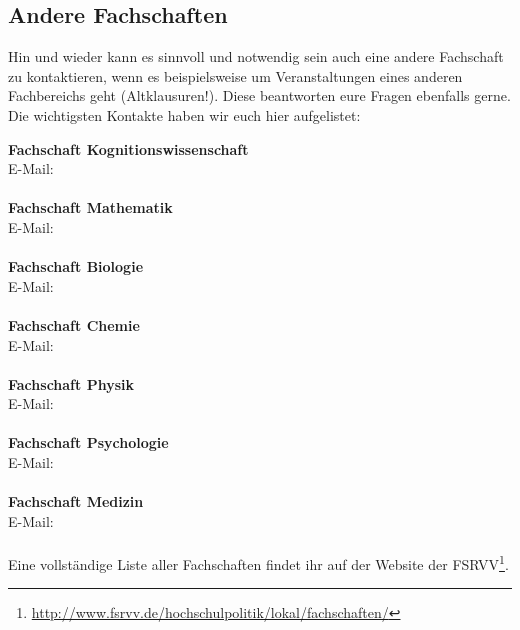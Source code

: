 

\vfill
\subsection{Andere Fachschaften}
Hin und wieder kann es sinnvoll und notwendig sein auch eine andere Fachschaft
zu kontaktieren, wenn es beispielsweise um Veranstaltungen eines anderen
Fachbereichs geht (Altklausuren!). Diese beantworten eure Fragen ebenfalls
gerne. Die wichtigsten Kontakte haben wir euch hier aufgelistet:

\textbf{Fachschaft Kognitionswissenschaft}\\
E-Mail: \\
\\
\textbf{Fachschaft Mathematik}\\
E-Mail: \\
\\
\textbf{Fachschaft Biologie}\\
E-Mail: \\
\\
\textbf{Fachschaft Chemie}\\
E-Mail: \\
\\
\textbf{Fachschaft Physik}\\
E-Mail: \\
\\
\textbf{Fachschaft Psychologie}\\
E-Mail: \\
\\
\textbf{Fachschaft Medizin}\\
E-Mail: \\
\\
Eine vollständige Liste aller Fachschaften findet ihr auf der Website der
FSRVV\footnote{\url{http://www.fsrvv.de/hochschulpolitik/lokal/fachschaften/}}.

\vfill
